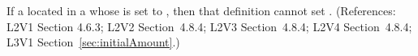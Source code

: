 If a \Species located in a \Compartment whose  is
set to , then that \Species definition cannot set
.  (References: L2V1 Section 4.6.3; L2V2
Section~4.8.4; L2V3 Section~4.8.4; L2V4 Section~4.8.4; L3V1 Section~\ref{sec:initialAmount}.)
